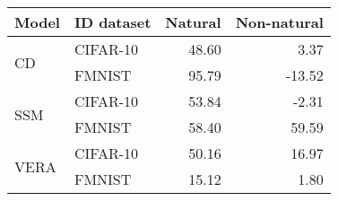 \begin{tabular}{llrr}
\toprule
 Model    & ID dataset &  Natural & Non-natural \\
\midrule
\multirow{2}{*}{CD} & CIFAR-10 &    48.60 &       3.37 \\
     & FMNIST &    95.79 &     -13.52 \\
\midrule
\multirow{2}{*}{SSM} & CIFAR-10 &    53.84 &      -2.31 \\
     & FMNIST &    58.40 &      59.59 \\
\midrule
\multirow{2}{*}{VERA} & CIFAR-10 &    50.16 &      16.97 \\
     & FMNIST &    15.12 &       1.80 \\
\bottomrule
\end{tabular}
